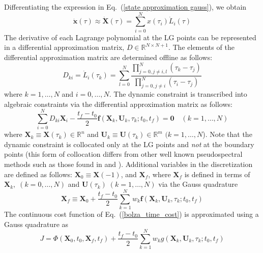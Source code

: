 \documentclass[10pt,final]{report}
\begin{document}
Differentiating the expression in Eq.~(\ref{state approximation gauss}), we
obtain
\begin{equation}
  \dot{\textbf{x}}(\tau) \approx \dot{\textbf{X}}(\tau)   =  \sum_{i=0}^N x(\tau_i)
  \dot{L}_i(\tau) \label{derivative state approximation}
\end{equation}
The derivative of each Lagrange polynomial at the LG points can be
represented in a differential approximation matrix,
$D\in\mathbb{R}^{N\times N+1}$.  The elements of the differential
approximation matrix are determined offline as follows:
\begin{equation}
  D_{ki} = \dot L_i(\tau_k) = \sum_{l=0}^N \frac{\displaystyle
    \prod_{j = 0,j \not= i,l}^N (\tau_k - \tau_j)}{\displaystyle
    \prod_{j = 0,j \not= i}^N (\tau_i - \tau_j)}
\end{equation}
where $k = 1,\ldots,N$ and $i = 0,\ldots,N$.  The dynamic constraint
is transcribed into algebraic constraints via the differential
approximation matrix as follows:
\begin{equation}\label{diff_dis_dyn}
    \sum_{i=0}^N D_{ki}
    \textbf{X}_i - \displaystyle\frac{t_f-t_0}{2}
    \textbf{f}(\textbf{X}_k,\textbf{U}_k,\tau_k;t_0,t_f) = \textbf{0} \quad
    (k = 1,\ldots,N)
\end{equation}
where $\textbf{X}_k \equiv \textbf{X}(\tau_k)\in\mathbb{R}^n$ and
$\textbf{U}_k \equiv \textbf{U}(\tau_k)\in\mathbb{R}^m$
$(k=1,\ldots,N$).  Note that the dynamic constraint is collocated
only at the LG points and {\em not} at the boundary
points (this form of collocation differs from other well known
pseudospectral methods such as those found in \cite{Elnagar1} and \cite{Elnagar2}).  Additional
variables in the discretization are defined as follows:
$\textbf{X}_0\equiv\textbf{X}(-1)$, and
$\textbf{X}_f$,  where $\textbf{X}_f$ is
defined in terms of $\textbf{X}_k,\;(k=0,\ldots,N)$ and
$\textbf{U}(\tau_k)\;(k=1,\ldots,N)$ via the Gauss quadrature \cite{Davis1}
\begin{equation} \label{gauss quadrature of xf}
  \textbf{X}_f \equiv \textbf{X}_0 +
  \displaystyle\frac{t_f-t_0}{2}\sum_{k=1}^N w_k
  \textbf{f}(\textbf{X}_k,\textbf{U}_k,\tau_k;t_0,t_f)
\end{equation}
The continuous cost function of Eq.~(\ref{bolza_time_cost}) is
approximated using a Gauss quadrature\cite{Davis1} as
\begin{equation}\label{diff_dis_cost}
    J = \Phi(\textbf{X}_0,t_0,\textbf{X}_f,t_f) + \displaystyle\frac{t_f-t_0}{2}\sum_{k=1}^N w_k g(\textbf{X}_k,\textbf{U}_k,\tau_k;t_0,t_f)
\end{equation}
\end{document}

